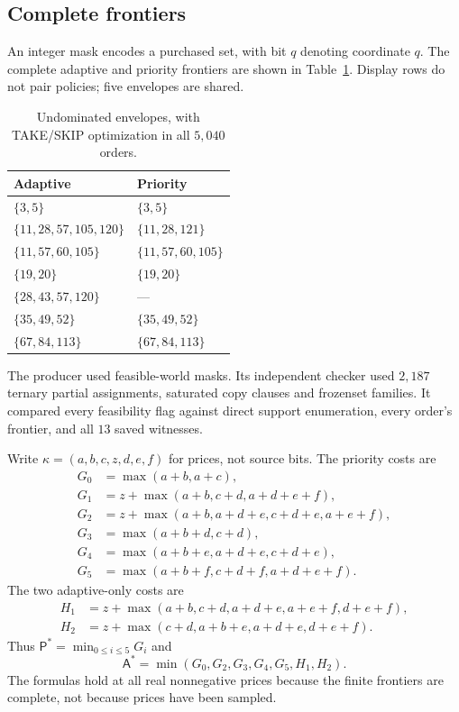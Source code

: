 \documentclass[pdflatex,sn-mathphys-num]{sn-jnl}
\newcommand{\A}{\mathsf{A}}
\newcommand{\Pcost}{\mathsf{P}}
\theoremstyle{thmstyleone}
\theoremstyle{thmstylethree}
\theoremstyle{thmstyletwo}
\begin{document}
\subsection{Complete frontiers}
An integer mask encodes a purchased set, with bit $q$ denoting coordinate $q$. The complete adaptive and priority frontiers are shown in Table~\ref{tab:frontiers}. Display rows do not pair policies; five envelopes are shared.
\begin{table}[ht]
\centering
\begin{tabular}{@{}ll@{}}\toprule
Adaptive & Priority\\\midrule
$\{3,5\}$ & $\{3,5\}$\\
$\{11,28,57,105,120\}$ & $\{11,28,121\}$\\
$\{11,57,60,105\}$ & $\{11,57,60,105\}$\\
$\{19,20\}$ & $\{19,20\}$\\
$\{28,43,57,120\}$ & ---\\
$\{35,49,52\}$ & $\{35,49,52\}$\\
$\{67,84,113\}$ & $\{67,84,113\}$\\\bottomrule
\end{tabular}
\caption{Undominated envelopes, with TAKE/SKIP optimization in all $5,040$ orders.}\label{tab:frontiers}
\end{table}
The producer used feasible-world masks. Its independent checker used $2,187$ ternary partial assignments, saturated copy clauses and frozenset families. It compared every feasibility flag against direct support enumeration, every order's frontier, and all $13$ saved witnesses.

Write $\kappa=(a,b,c,z,d,e,f)$ for prices, not source bits. The priority costs are
\begin{align*}
G_0&=\max(a+b,a+c),\\
G_1&=z+\max(a+b,c+d,a+d+e+f),\\
G_2&=z+\max(a+b,a+d+e,c+d+e,a+e+f),\\
G_3&=\max(a+b+d,c+d),\\
G_4&=\max(a+b+e,a+d+e,c+d+e),\\
G_5&=\max(a+b+f,c+d+f,a+d+e+f).
\end{align*}
The two adaptive-only costs are
\begin{align*}
H_1&=z+\max(a+b,c+d,a+d+e,a+e+f,d+e+f),\\
H_2&=z+\max(c+d,a+b+e,a+d+e,d+e+f).
\end{align*}
Thus $\Pcost^*=\min_{0\leq i\leq5}G_i$ and
\[
 \A^*=\min(G_0,G_2,G_3,G_4,G_5,H_1,H_2).
\]
The formulas hold at all real nonnegative prices because the finite frontiers are complete, not because prices have been sampled.
\end{document}
